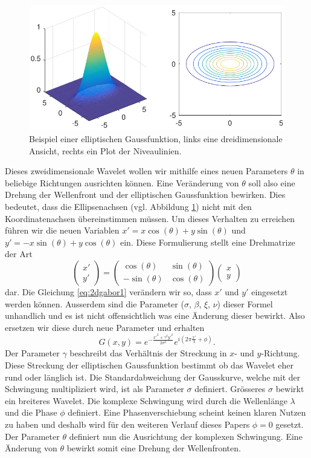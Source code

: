 \begin{figure}
	\centering
	\includegraphics[width=0.7\linewidth]{./papers/visuell/images/2d_gauss.pdf}
	\caption{Beispiel einer elliptischen Gaussfunktion, links eine dreidimensionale Ansicht, rechts ein Plot der Niveaulinien.}
	\label{fig:2d_gauss}
\end{figure}

Dieses zweidimensionale Wavelet wollen wir mithilfe eines neuen Parameters $\theta$ in beliebige Richtungen ausrichten können.
Eine Veränderung von $\theta$ soll also eine Drehung der Wellenfront und der elliptischen Gaussfunktion bewirken.
Dies bedeutet, dass die Ellipsenachsen (vgl. Abbildung \ref{fig:2d_gauss}) nicht mit den Koordinatenachsen übereinstimmen müssen. 
Um dieses Verhalten zu erreichen führen wir die neuen Variablen $x'=x\cos(\theta)+y\sin(\theta)$ und $y'=-x\sin(\theta)+y\cos(\theta)$ ein.
Diese Formulierung stellt eine Drehmatrize der Art
\begin{equation}
\begin{pmatrix}
x' \\
y'
\end{pmatrix}
=
\begin{pmatrix}
\cos(\theta) & \sin(\theta) \\
-\sin(\theta) & \cos(\theta)
\end{pmatrix}
\begin{pmatrix}
x \\
y
\end{pmatrix}
\end{equation}
dar.
Die Gleichung \ref{eq:2dgabor1} verändern wir so, dass $x'$ und $y'$ eingesetzt werden können.
Ausserdem sind die Parameter ($\sigma$, $\beta$, $\xi$, $\nu$) dieser Formel unhandlich und es ist nicht offensichtlich was eine Änderung dieser bewirkt.
Also ersetzen wir diese durch neue Parameter und erhalten 
\begin{equation}
G(x,y)=e^{-\frac{x'^{2}+\gamma^{2}y'^{2}}{2\sigma^{2}}}
e^{i(2\pi\frac{x'}{\lambda} + \phi)}.
\end{equation} 
Der Parameter $\gamma$ beschreibt das Verhältnis der Streckung in $x$- und $y$-Richtung.
Diese Streckung der elliptischen Gaussfunktion bestimmt ob das Wavelet eher rund oder länglich ist.
Die Standardabweichung der Gausskurve, welche mit der Schwingung multipliziert wird, ist als Parameter $\sigma$ definiert.
Grösseres $\sigma$ bewirkt ein breiteres Wavelet.
Die komplexe Schwingung wird durch die Wellenlänge $\lambda$ und die Phase $\phi$ definiert.
Eine Phasenverschiebung scheint keinen klaren Nutzen zu haben und deshalb  wird für den weiteren Verlauf dieses Papers $\phi=0$ gesetzt.
Der Parameter $\theta$ definiert nun die Ausrichtung der komplexen Schwingung.
Eine Änderung von $\theta$  bewirkt somit eine Drehung der Wellenfronten.

